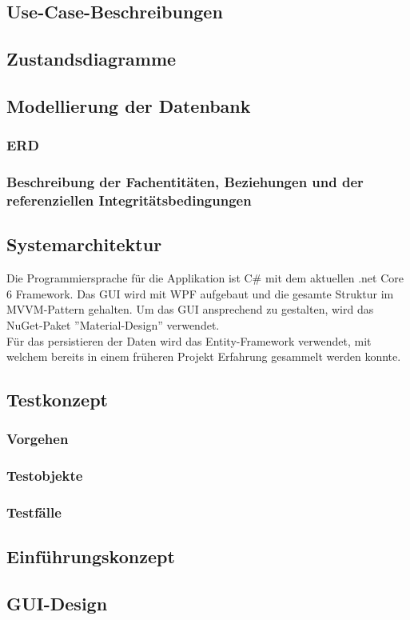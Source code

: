 \subsection{Use-Case-Beschreibungen}


\subsection{Zustandsdiagramme}
\subsection{Modellierung der Datenbank}
\subsubsection{ERD}
\subsubsection{Beschreibung der Fachentitäten, Beziehungen und der referenziellen Integritätsbedingungen}
\subsection{Systemarchitektur}
Die Programmiersprache für die Applikation ist C\# mit dem aktuellen .net Core 6 Framework. Das GUI wird mit WPF aufgebaut und die gesamte Struktur im MVVM-Pattern gehalten. Um das GUI ansprechend zu gestalten, wird das NuGet-Paket ''Material-Design'' verwendet.\\
Für das persistieren der Daten wird das Entity-Framework verwendet, mit welchem bereits in einem früheren Projekt Erfahrung gesammelt werden konnte.
\subsection{Testkonzept} \label{testkonzept}
\subsubsection{Vorgehen}
\subsubsection{Testobjekte}
\subsubsection{Testfälle}
\subsection{Einführungskonzept}
\subsection{GUI-Design}